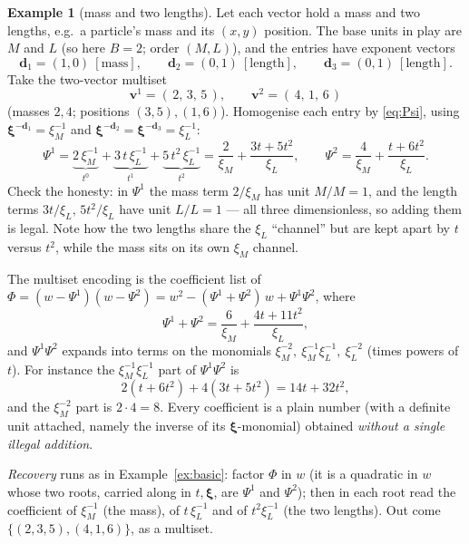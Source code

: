 \documentclass[11pt,a4paper]{article}
\theoremstyle{definition}
\newtheorem{example}[definition]{Example}
\theoremstyle{plain}
\newcommand{\bvec}[1]{\mathbf{#1}}
\begin{document}
\begin{example}[mass and two lengths]\label{ex:homog}
Let each vector hold a mass and two lengths, e.g.\ a particle's mass and its
$(x,y)$ position. The base units in play are $M$ and $L$ (so here $B=2$; order
$(M,L)$), and the entries have exponent vectors
\[
   \bvec d_1=(1,0)\ [\text{mass}],\qquad
   \bvec d_2=(0,1)\ [\text{length}],\qquad
   \bvec d_3=(0,1)\ [\text{length}].
\]
Take the two-vector multiset
\[
   \bvec v^1=(\,2,\,3,\,5\,),\qquad \bvec v^2=(\,4,\,1,\,6\,)
\]
(masses $2,4$; positions $(3,5),(1,6)$). Homogenise each entry by
\eqref{eq:Psi}, using $\boldsymbol\xi^{-\bvec d_1}=\xi_M^{-1}$ and
$\boldsymbol\xi^{-\bvec d_2}=\boldsymbol\xi^{-\bvec d_3}=\xi_L^{-1}$:
\[
   \Psi^1=\underbrace{2\,\xi_M^{-1}}_{t^0}
          +\underbrace{3\,t\,\xi_L^{-1}}_{t^1}
          +\underbrace{5\,t^2\,\xi_L^{-1}}_{t^2}
        =\frac{2}{\xi_M}+\frac{3t+5t^2}{\xi_L},
   \qquad
   \Psi^2=\frac{4}{\xi_M}+\frac{t+6t^2}{\xi_L}.
\]
Check the honesty: in $\Psi^1$ the mass term $2/\xi_M$ has unit $M/M=1$, and the
length terms $3t/\xi_L,\,5t^2/\xi_L$ have unit $L/L=1$ --- all three dimensionless,
so adding them is legal. Note how the two lengths share the $\xi_L$ ``channel'' but
are kept apart by $t$ versus $t^2$, while the mass sits on its own $\xi_M$ channel.

The multiset encoding is the coefficient list of
$\Phi=(w-\Psi^1)(w-\Psi^2)
      =w^2-(\Psi^1+\Psi^2)\,w+\Psi^1\Psi^2$, where
\[
   \Psi^1+\Psi^2=\frac{6}{\xi_M}+\frac{4t+11t^2}{\xi_L},
\]
and $\Psi^1\Psi^2$ expands into terms on the monomials
$\xi_M^{-2},\ \xi_M^{-1}\xi_L^{-1},\ \xi_L^{-2}$ (times powers of $t$). For
instance the $\xi_M^{-1}\xi_L^{-1}$ part of $\Psi^1\Psi^2$ is
\[
   2(t+6t^2)+4(3t+5t^2)=14t+32t^2 ,
\]
and the $\xi_M^{-2}$ part is $2\cdot4=8$. Every coefficient is a plain number
(with a definite unit attached, namely the inverse of its $\boldsymbol\xi$-monomial)
obtained \emph{without a single illegal addition}.

\emph{Recovery} runs as in Example~\ref{ex:basic}: factor $\Phi$ in $w$ (it is a
quadratic in $w$ whose two roots, carried along in $t,\boldsymbol\xi$, are
$\Psi^1$ and $\Psi^2$); then in each root read the coefficient of $\xi_M^{-1}$
(the mass), of $t\,\xi_L^{-1}$ and of $t^2\xi_L^{-1}$ (the two lengths). Out come
$\{(2,3,5),(4,1,6)\}$, as a multiset.
\end{example}
\end{document}
